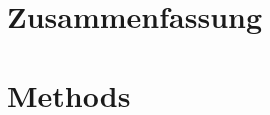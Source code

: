 \documentclass[
oneside,
a4paper,
12pt,
titlepage]
{article}
\begin{document}

\newpage


\newpage


\newpage

\section*{Zusammenfassung}


\pagestyle{standard}

% 

% 
% 

\section{Methods}






% 
% 
% 
% 
% 
% 
% 

% 
% 
% 
% 
% 
% 

% 

% 

% 
\end{document}

